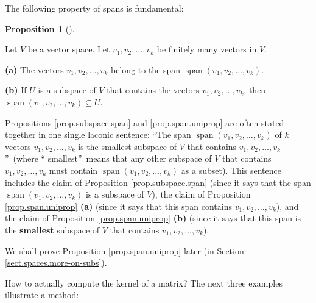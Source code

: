 \documentclass[numbers=enddot,12pt,final,onecolumn,notitlepage]{scrartcl}%
\theoremstyle{definition}
\newtheorem{prop}[theo]{Proposition}
\newenvironment{proposition}[1][]
{\begin{prop}[#1]\begin{leftbar}}
{\end{leftbar}\end{prop}}
\begin{document}
The following property of spans is fundamental:

\begin{proposition}
\label{prop.span.uniprop}Let $V$ be a vector space. Let $v_{1},v_{2}%
,\ldots,v_{k}$ be finitely many vectors in $V$.

\textbf{(a)} The vectors $v_{1},v_{2},\ldots,v_{k}$ belong to the span
$\operatorname{span}\left(  v_{1},v_{2},\ldots,v_{k}\right)  $.

\textbf{(b)} If $U$ is a subspace of $V$ that contains the vectors
$v_{1},v_{2},\ldots,v_{k}$, then $\operatorname{span}\left(  v_{1}%
,v_{2},\ldots,v_{k}\right)  \subseteq U$.
\end{proposition}

Propositions \ref{prop.subspace.span} and \ref{prop.span.uniprop} are often
stated together in one single laconic sentence: \textquotedblleft The span
$\operatorname{span}\left(  v_{1},v_{2},\ldots,v_{k}\right)  $ of $k$ vectors
$v_{1},v_{2},\ldots,v_{k}$ is the smallest subspace of $V$ that contains
$v_{1},v_{2},\ldots,v_{k}$\textquotedblright\ (where \textquotedblleft
smallest\textquotedblright\ means that any other subspace of $V$ that contains
$v_{1},v_{2},\ldots,v_{k}$ must contain $\operatorname{span}\left(
v_{1},v_{2},\ldots,v_{k}\right)  $ as a subset). This sentence includes the
claim of Proposition \ref{prop.subspace.span} (since it says that the span
$\operatorname{span}\left(  v_{1},v_{2},\ldots,v_{k}\right)  $ is a subspace
of $V$), the claim of Proposition \ref{prop.span.uniprop} \textbf{(a)} (since
it says that this span contains $v_{1},v_{2},\ldots,v_{k}$), and the claim of
Proposition \ref{prop.span.uniprop} \textbf{(b)} (since it says that this span
is the \textbf{smallest} subspace of $V$ that contains $v_{1},v_{2}%
,\ldots,v_{k}$).

We shall prove Proposition \ref{prop.span.uniprop} later (in Section
\ref{sect.spaces.more-on-subs}).

How to actually compute the kernel of a matrix? The next three examples
illustrate a method:
\end{document}
